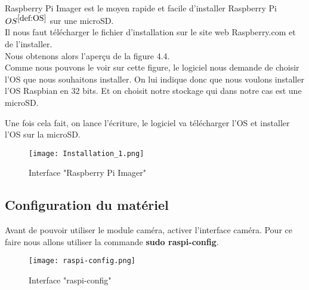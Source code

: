             \begin{flushleft}
                Raspberry Pi Imager est le moyen rapide et facile d'installer Raspberry Pi \underline{$OS^{\ref{def:OS}}$} sur une microSD.\\[0.2cm]

                Il nous faut télécharger le fichier d'installation sur le site web Raspberry.com et de l'installer.\\[0.2cm]

                Nous obtenons alors l'aperçu de la figure 4.4.\\[0.2cm]
                Comme nous pouvons le voir sur cette figure, le logiciel nous demande de choisir l'OS que nous souhaitons installer.
                On lui indique donc que nous voulons installer l'OS Raspbian en 32 bits. Et on choisit notre stockage qui dans notre cas est une microSD.

                \vspace{0.2cm}

                Une fois cela fait, on lance l'écriture, le logiciel va télécharger l'OS et installer l'OS sur la microSD.


            \begin{figure}[t]
                \centering
                \texttt{[image: Installation\_1.png]} 
                \caption{Interface "Raspberry Pi Imager"}
            \end{figure}


            \end{flushleft}
    
            \subsection{Configuration du matériel}
            Avant de pouvoir utiliser le module caméra, activer l'interface caméra.
            Pour ce faire nous allons utiliser la commande \textbf{sudo raspi-config}.

            \begin{figure}[h]
                \centering
                \texttt{[image: raspi-config.png]} 
                \caption{Interface "raspi-config"}
            \end{figure}

